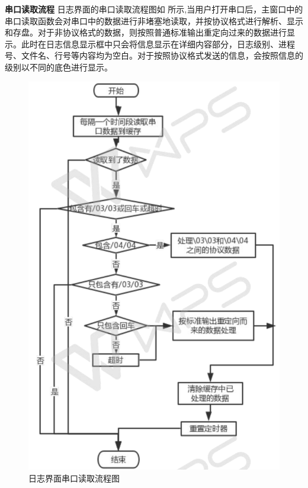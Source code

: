 \textbf{串口读取流程}
日志界面的串口读取流程图如 所示,当用户打开串口后，主窗口中的串口读取函数会对串口中的数据进行非堵塞地读取，并按协议格式进行解析、显示和存盘。对于非协议格式的数据，则按照普通标准输出重定向过来的数据进行显示。此时在日志信息显示框中只会将信息显示在详细内容部分，日志级别、进程号、文件名、行号等内容均为空白。对于按照协议格式发送的信息，会按照信息的级别以不同的底色进行显示。
\begin{figure}[!h]
\centering
\includegraphics[width=.6\textwidth]{./graphics/LogTTYRead.pdf}
\caption{日志界面串口读取流程图}\label{fig:串口读取流程图}
\end{figure}

